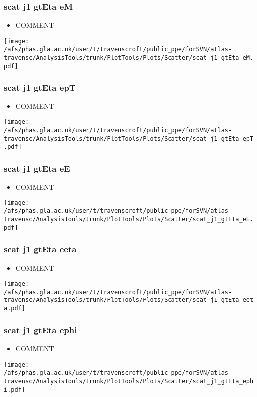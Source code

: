 \documentclass{beamer}
\begin{document}
\begin{frame}
\frametitle{scat j1 gtEta eM}
\begin{itemize}
\item COMMENT
\end{itemize}
\begin{center}
\texttt{[image: /afs/phas.gla.ac.uk/user/t/travenscroft/public\_ppe/forSVN/atlas-travensc/AnalysisTools/trunk/PlotTools/Plots/Scatter/scat\_j1\_gtEta\_eM.pdf]}
\end{center}
\end{frame}

\begin{frame}
\frametitle{scat j1 gtEta epT}
\begin{itemize}
\item COMMENT
\end{itemize}
\begin{center}
\texttt{[image: /afs/phas.gla.ac.uk/user/t/travenscroft/public\_ppe/forSVN/atlas-travensc/AnalysisTools/trunk/PlotTools/Plots/Scatter/scat\_j1\_gtEta\_epT.pdf]}
\end{center}
\end{frame}

\begin{frame}
\frametitle{scat j1 gtEta eE}
\begin{itemize}
\item COMMENT
\end{itemize}
\begin{center}
\texttt{[image: /afs/phas.gla.ac.uk/user/t/travenscroft/public\_ppe/forSVN/atlas-travensc/AnalysisTools/trunk/PlotTools/Plots/Scatter/scat\_j1\_gtEta\_eE.pdf]}
\end{center}
\end{frame}

\begin{frame}
\frametitle{scat j1 gtEta eeta}
\begin{itemize}
\item COMMENT
\end{itemize}
\begin{center}
\texttt{[image: /afs/phas.gla.ac.uk/user/t/travenscroft/public\_ppe/forSVN/atlas-travensc/AnalysisTools/trunk/PlotTools/Plots/Scatter/scat\_j1\_gtEta\_eeta.pdf]}
\end{center}
\end{frame}

\begin{frame}
\frametitle{scat j1 gtEta ephi}
\begin{itemize}
\item COMMENT
\end{itemize}
\begin{center}
\texttt{[image: /afs/phas.gla.ac.uk/user/t/travenscroft/public\_ppe/forSVN/atlas-travensc/AnalysisTools/trunk/PlotTools/Plots/Scatter/scat\_j1\_gtEta\_ephi.pdf]}
\end{center}
\end{frame}
\end{document}

